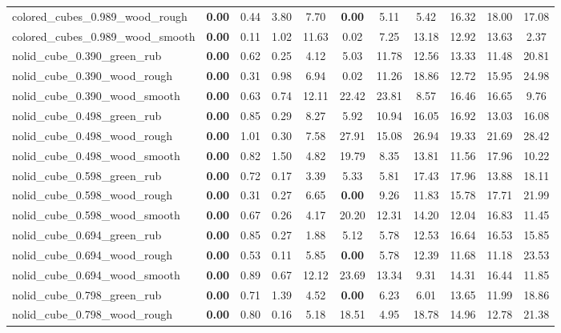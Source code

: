 \begin{table}[H]
{\begin{tabular}{l cccccccccc}
        colored\_cubes\_0.989\_wood\_rough & \textbf{0.00} & 0.44 & 3.80 & 7.70 & \textbf{0.00} & 5.11 & 5.42 & 16.32 & 18.00 & 17.08 \\
        colored\_cubes\_0.989\_wood\_smooth & \textbf{0.00} & 0.11 & 1.02 & 11.63 & 0.02 & 7.25 & 13.18 & 12.92 & 13.63 & 2.37 \\
        nolid\_cube\_0.390\_green\_rub & \textbf{0.00} & 0.62 & 0.25 & 4.12 & 5.03 & 11.78 & 12.56 & 13.33 & 11.48 & 20.81 \\
        nolid\_cube\_0.390\_wood\_rough & \textbf{0.00} & 0.31 & 0.98 & 6.94 & 0.02 & 11.26 & 18.86 & 12.72 & 15.95 & 24.98 \\
        nolid\_cube\_0.390\_wood\_smooth & \textbf{0.00} & 0.63 & 0.74 & 12.11 & 22.42 & 23.81 & 8.57 & 16.46 & 16.65 & 9.76 \\
        nolid\_cube\_0.498\_green\_rub & \textbf{0.00} & 0.85 & 0.29 & 8.27 & 5.92 & 10.94 & 16.05 & 16.92 & 13.03 & 16.08 \\
        nolid\_cube\_0.498\_wood\_rough & \textbf{0.00} & 1.01 & 0.30 & 7.58 & 27.91 & 15.08 & 26.94 & 19.33 & 21.69 & 28.42 \\
        nolid\_cube\_0.498\_wood\_smooth & \textbf{0.00} & 0.82 & 1.50 & 4.82 & 19.79 & 8.35 & 13.81 & 11.56 & 17.96 & 10.22 \\
        nolid\_cube\_0.598\_green\_rub & \textbf{0.00} & 0.72 & 0.17 & 3.39 & 5.33 & 5.81 & 17.43 & 17.96 & 13.88 & 18.11 \\
        nolid\_cube\_0.598\_wood\_rough & \textbf{0.00} & 0.31 & 0.27 & 6.65 & \textbf{0.00} & 9.26 & 11.83 & 15.78 & 17.71 & 21.99 \\
        nolid\_cube\_0.598\_wood\_smooth & \textbf{0.00} & 0.67 & 0.26 & 4.17 & 20.20 & 12.31 & 14.20 & 12.04 & 16.83 & 11.45 \\
        nolid\_cube\_0.694\_green\_rub & \textbf{0.00} & 0.85 & 0.27 & 1.88 & 5.12 & 5.78 & 12.53 & 16.64 & 16.53 & 15.85 \\
        nolid\_cube\_0.694\_wood\_rough & \textbf{0.00} & 0.53 & 0.11 & 5.85 & \textbf{0.00} & 5.78 & 12.39 & 11.68 & 11.18 & 23.53 \\
        nolid\_cube\_0.694\_wood\_smooth & \textbf{0.00} & 0.89 & 0.67 & 12.12 & 23.69 & 13.34 & 9.31 & 14.31 & 16.44 & 11.85 \\
        nolid\_cube\_0.798\_green\_rub & \textbf{0.00} & 0.71 & 1.39 & 4.52 & \textbf{0.00} & 6.23 & 6.01 & 13.65 & 11.99 & 18.86 \\
        nolid\_cube\_0.798\_wood\_rough & \textbf{0.00} & 0.80 & 0.16 & 5.18 & 18.51 & 4.95 & 18.78 & 14.96 & 12.78 & 21.38 \\

\end{tabular}}
\end{table}
